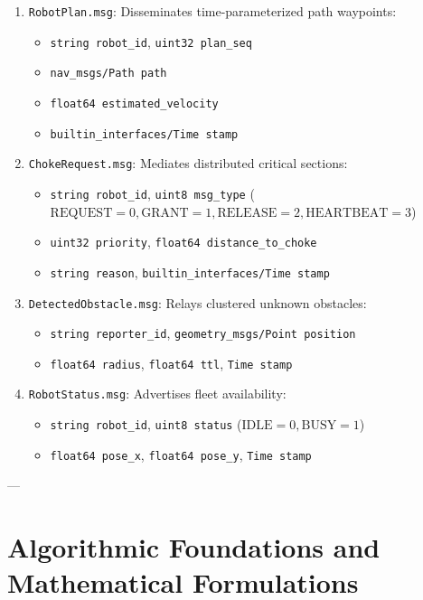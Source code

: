 \documentclass[10pt,twocolumn,a4paper]{article}
\theoremstyle{definition}
\begin{document}
\begin{enumerate}
    \item \texttt{RobotPlan.msg}: Disseminates time-parameterized path waypoints:
    \begin{itemize}
        \item \texttt{string robot\_id}, \texttt{uint32 plan\_seq}
        \item \texttt{nav\_msgs/Path path}
        \item \texttt{float64 estimated\_velocity}
        \item \texttt{builtin\_interfaces/Time stamp}
    \end{itemize}
    \item \texttt{ChokeRequest.msg}: Mediates distributed critical sections:
    \begin{itemize}
        \item \texttt{string robot\_id}, \texttt{uint8 msg\_type} ($\text{REQUEST}=0, \text{GRANT}=1, \text{RELEASE}=2, \text{HEARTBEAT}=3$)
        \item \texttt{uint32 priority}, \texttt{float64 distance\_to\_choke}
        \item \texttt{string reason}, \texttt{builtin\_interfaces/Time stamp}
    \end{itemize}
    \item \texttt{DetectedObstacle.msg}: Relays clustered unknown obstacles:
    \begin{itemize}
        \item \texttt{string reporter\_id}, \texttt{geometry\_msgs/Point position}
        \item \texttt{float64 radius}, \texttt{float64 ttl}, \texttt{Time stamp}
    \end{itemize}
    \item \texttt{RobotStatus.msg}: Advertises fleet availability:
    \begin{itemize}
        \item \texttt{string robot\_id}, \texttt{uint8 status} ($\text{IDLE}=0, \text{BUSY}=1$)
        \item \texttt{float64 pose\_x}, \texttt{float64 pose\_y}, \texttt{Time stamp}
    \end{itemize}
\end{enumerate}

---

\section{Algorithmic Foundations and Mathematical Formulations}
\end{document}
